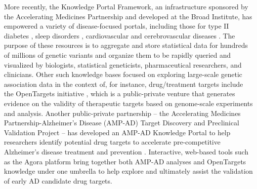 \documentclass[letter]{bib}
\begin{document}
More recently, the Knowledge Portal Framework, an infrastructure sponsored by the Accelerating Medicines Partnership and developed at the Broad Institute, has empowered a variety of disease-focused portals, including those for type II diabetes \citep{Broad:2018:Type}, sleep disorders \citep{Broad:2018:Sleep}, cardiovascular \citep{Broad:2018:Cardiovascular} and cerebrovascular diseases \citep{Broad:2018:Cerebrovascular}.  The purpose of these resources is to aggregate and store statistical data for hundreds of millions of genetic variants and organize them to be rapidly queried and visualized by biologists, statistical geneticists, pharmaceutical researchers, and clinicians.  Other such knowledge bases focused on exploring large-scale genetic association data in the context of, for instance, drug/treatment targets include the OpenTargets initiative \citep{Koscielny:2017:Open}, which is a public-private venture that generates evidence on the validity of therapeutic targets based on genome-scale experiments and analysis.  Another public-private partnership -- the Accelerating Medicines Partnership-Alzheimer's Disease (AMP-AD) Target Discovery and Preclinical Validation Project -- has developed an AMP-AD Knowledge Portal to help researchers identify potential drug targets to accelerate pre-competitive Alzheimer's disease treatment and prevention \citep{NIA:2015:AMP}.  Interactive, web-based tools such as the Agora platform \citep{Agora:2018} bring together both AMP-AD analyses and OpenTargets knowledge under one umbrella to help explore and ultimately assist the validation of early AD candidate drug targets.  
	
\end{document}
